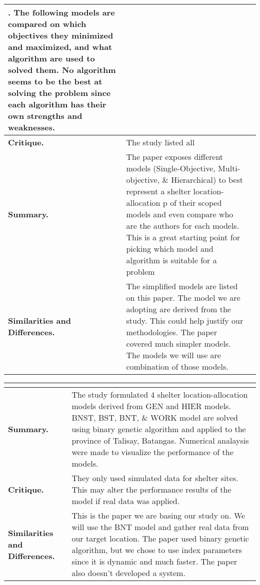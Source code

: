 \begin{longtable}{|L{.2\linewidth}|L{.74\linewidth}|}
	\hlineroblem. The following models are compared on which objectives they minimized and maximized, and what algorithm are used to solved them. No algorithm seems to be the best at solving the problem since each algorithm has their own strengths and weaknesses.\\ \hline
	\textbf{Critique.} & The study listed all
	\\ \hline
	\textbf{Summary.} & The paper exposes different models (Single-Objective, Multi-objective, \& Hierarchical) to best represent a shelter location-allocation p of their scoped models and even compare who are the authors for each models. This is a great starting point for picking which model and algorithm is suitable for a problem\\ \hline
	\textbf{Similarities and Differences.} & The simplified models are listed on this paper. The model we are adopting are derived from the study. This could help justify our methodologies.	The paper covered much simpler models. The models we will use are combination of those models.\\ \hline
\end{longtable}

\begin{longtable}{|L{.2\linewidth}|L{.74\linewidth}|}
	\hline
	\\ \hline
	\textbf{Summary.} & The study formulated 4 shelter location-allocation models derived from GEN and HIER models. BNST, BST, BNT, \& WORK model are solved using binary genetic algorithm and applied to the province of Talisay, Batangas. Numerical analaysis were made to visualize the performance of the models.\\ \hline
	\textbf{Critique.} & They only used simulated data for shelter sites. This may alter the performance results of the model if real data was applied.\\ \hline
	\textbf{Similarities and Differences.} & This is the paper we are basing our study on. We will use the BNT model and gather real data from our target location.	The paper used binary genetic algorithm, but we chose to use index parameters since it is dynamic and much faster. The paper also doesn't developed a system.\\ \hline
\end{longtable}


